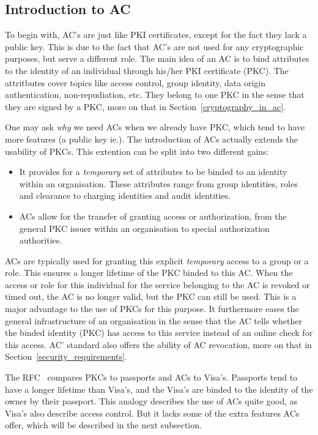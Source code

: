 \documentclass[10pt,conference,a4paper]{IEEEtran}
\begin{document}
\subsection{Introduction to AC}
To begin with, AC's are just like PKI certificates, except for the fact they lack a public key. This is due to the fact that AC's are not used for any cryptographic purposes, but serve a different role. The main idea of an AC is to bind attributes to the identity of an individual through his/her PKI certificate (PKC). The attritbutes cover topics like access control, group identity, data origin authentication, non-repudiation, etc. They belong to one PKC in the sense that they are signed by a PKC, more on that in Section~\ref{cryptography_in_ac}.

One may ask \textit{why} we need ACs when we already have PKC, which tend to have more features (a public key ie.). The introduction of ACs actually extends the usability of PKCs. This extention can be split into two different gains:
\begin{itemize}
	\item It provides for a \textit{temporary} set of attributes to be binded to an identity within an organisation. These attributes range from group identities, roles and clearance to charging identities and audit identities. 
	\item ACs allow for the transfer of granting access or authorization, from the general PKC issuer within an organisation to special authorization authorities.
\end{itemize}

ACs are typically used for granting this explicit \textit{temporary} access to a group or a role. This ensures a longer lifetime of the PKC binded to this AC. When the access or role for this individual for the service belonging to the AC is revoked or timed out, the AC is no longer valid, but the PKC can still be used. This is a major advantage to the use of PKCs for this purpose. It furthermore eases the general infrastructure of an organisation in the sense that the AC tells whether the binded identity (PKC) has access to this service instead of an online check for this access. AC' standard also offers the ability of AC revocation, more on that in Section~\ref{security_requirements}.

The RFC~\cite{rfc_ac} compares PKCs to passports and ACs to Visa's. Passports tend to have a longer lifetime than Visa's, and the Visa's are binded to the identity of the owner by their passport. This analogy describes the use of ACs quite good, as Visa's also describe access control. But it lacks some of the extra features ACs offer, which will be described in the next subsection.
\end{document}
